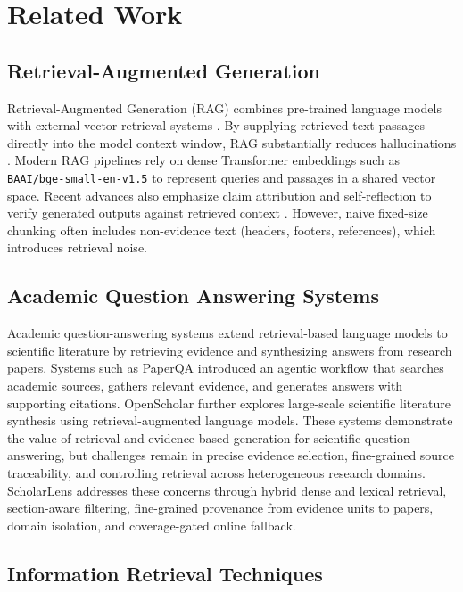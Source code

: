 \documentclass[conference]{IEEEtran}
\begin{document}
\section{Related Work}

\subsection{Retrieval-Augmented Generation}

Retrieval-Augmented Generation (RAG) combines pre-trained language models with external vector retrieval systems \cite{lewis2020retrieval, guu2020realm}. By supplying retrieved text passages directly into the model context window, RAG substantially reduces hallucinations \cite{ji2023hallucination}. Modern RAG pipelines rely on dense Transformer embeddings such as \texttt{BAAI/bge-small-en-v1.5} to represent queries and passages in a shared vector space. Recent advances also emphasize claim attribution and self-reflection to verify generated outputs against retrieved context \cite{gao2023alce, asai2024selfrag, rashkin2023attribution}. However, naive fixed-size chunking often includes non-evidence text (headers, footers, references), which introduces retrieval noise.

\subsection{Academic Question Answering Systems}

Academic question-answering systems extend retrieval-based language models to scientific literature by retrieving evidence and synthesizing answers from research papers. Systems such as PaperQA \cite{lala2023paperqa} introduced an agentic workflow that searches academic sources, gathers relevant evidence, and generates answers with supporting citations. OpenScholar \cite{asai2026openscholar} further explores large-scale scientific literature synthesis using retrieval-augmented language models. These systems demonstrate the value of retrieval and evidence-based generation for scientific question answering, but challenges remain in precise evidence selection, fine-grained source traceability, and controlling retrieval across heterogeneous research domains. ScholarLens addresses these concerns through hybrid dense and lexical retrieval, section-aware filtering, fine-grained provenance from evidence units to papers, domain isolation, and coverage-gated online fallback.

\subsection{Information Retrieval Techniques}
\end{document}
